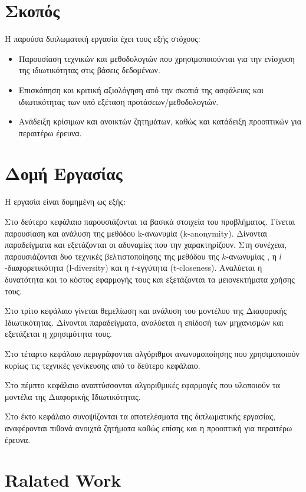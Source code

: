 \section{Σκοπός}

Η παρούσα διπλωματική εργασία έχει τους εξής στόχους:
\begin{itemize}
\item Παρουσίαση τεχνικών και μεθοδολογιών που χρησιμοποιούνται για την ενίσχυση της ιδιωτικότητας στις βάσεις δεδομένων.
\item Επισκόπηση και κριτική αξιολόγηση από την σκοπιά της ασφάλειας και ιδιωτικότητας των υπό εξέταση προτάσεων/μεθοδολογιών.
\item Ανάδειξη κρίσιμων και ανοικτών ζητημάτων, καθώς και κατάδειξη προοπτικών για περαιτέρω έρευνα.
\end{itemize}


\section{Δομή Εργασίας}

Η εργασία είναι δομημένη ως εξής:

Στο δεύτερο κεφάλαιο παρουσιάζονται τα βασικά στοιχεία του προβλήματος. Γίνεται παρουσίαση και ανάλυση της μεθόδου \textlatin{k}-ανωνυμία 
(\textlatin{k-anonymity}). 
Δίνονται παραδείγματα και εξετάζονται οι αδυναμίες που την χαρακτηρίζουν. Στη συνέχεια, παρουσιάζονται δυο τεχνικές βελτιστοποίησης της μεθόδου της $k$-ανωνυμίας , η $l$-διαφορετικότητα (\textlatin{l-diversity}) και η $t$-εγγύτητα (\textlatin{t-closeness}). Αναλύεται η δυνατότητα και το κόστος εφαρμογής τους και εξετάζονται τα μειονεκτήματα χρήσης τους.

Στο τρίτο κεφάλαιο γίνεται θεμελίωση και ανάλυση του μοντέλου της Διαφορικής Ιδιωτικότητας. Δίνονται παραδείγματα, αναλύεται η επίδοσή των μηχανισμών και εξετάζεται η χρησιμότητα τους. 

Στο τέταρτο κεφάλαιο περιγράφονται αλγόριθμοι ανωνυμοποίησης που χρησιμοποιούν κυρίως τις τεχνικές γενίκευσης από το δεύτερο κεφάλαιο.

Στο πέμπτο κεφάλαιο αναπτύσσονται αλγοριθμικές εφαρμογές που υλοποιούν τα μοντέλα της Διαφορικής Ιδιωτικότητας. 

Στο έκτο κεφάλαιο συνοψίζονται τα αποτελέσματα της διπλωματικής εργασίας, αναφέρονται πιθανά ανοιχτά ζητήματα  καθώς επίσης και η προοπτική για περαιτέρω έρευνα. 

\clearpage


\section{\textlatin{Ralated Work}}

